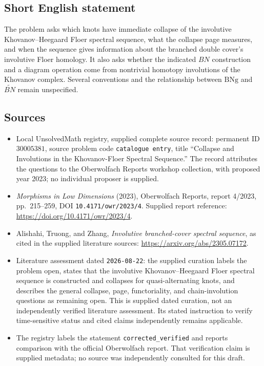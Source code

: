 \documentclass[11pt]{article}
\begin{document}
\subsection{Short English statement}
The problem asks which knots have immediate collapse of the involutive Khovanov--Heegaard Floer spectral sequence, what the collapse page measures, and when the sequence gives information about the branched double cover's involutive Floer homology. It also asks whether the indicated \(BN\) construction and a diagram operation come from nontrivial homotopy involutions of the Khovanov complex. Several conventions and the relationship between \(\mathrm{BNg}\) and \(\widetilde{BN}\) remain unspecified.
\subsection{Sources}
\begin{itemize}
\item Local UnsolvedMath registry, supplied complete source record: permanent ID \(30005381\), source problem code \texttt{catalogue entry}, title ``Collapse and Involutions in the Khovanov-Floer Spectral Sequence.'' The record attributes the questions to the Oberwolfach Reports workshop collection, with proposed year 2023; no individual proposer is supplied.
\item \emph{Morphisms in Low Dimensions} (2023), Oberwolfach Reports, report 4/2023, pp.~215--259, DOI \texttt{10.4171/owr/2023/4}. Supplied report reference: \url{https://doi.org/10.4171/owr/2023/4}.
\item Alishahi, Truong, and Zhang, \emph{Involutive branched-cover spectral sequence}, as cited in the supplied literature sources: \url{https://arxiv.org/abs/2305.07172}.
\item Literature assessment dated \texttt{2026-08-22}: the supplied curation labels the problem open, states that the involutive Khovanov--Heegaard Floer spectral sequence is constructed and collapses for quasi-alternating knots, and describes the general collapse, page, functoriality, and chain-involution questions as remaining open. This is supplied dated curation, not an independently verified literature assessment. Its stated instruction to verify time-sensitive status and cited claims independently remains applicable.
\item The registry labels the statement \texttt{corrected\_verified} and reports comparison with the official Oberwolfach report. That verification claim is supplied metadata; no source was independently consulted for this draft.
\end{itemize}
\end{document}
